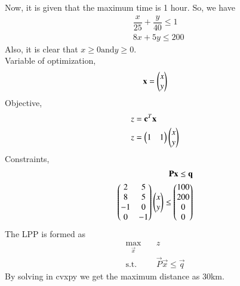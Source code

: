 \documentclass[journal,12pt,twocolumn]{IEEEtran}
\renewcommand\thesection{\arabic{section}}
\begin{document}
\begin{enumerate}[label=\thesection.\arabic*.,ref=\thesection.\theenumi]
Now, it is given that the maximum time is 1 hour. So, we have
\begin{align}
&\dfrac{x}{25}+\dfrac{y}{40}\leq 1\\
&8x+5y\leq200
\end{align}
Also, it is clear that $x\geq 0 \text{and} y \geq0$.\\
Variable of optimization,
\begin{align}
\mathbf{x} = \begin{pmatrix}x\\y\end{pmatrix}
\end{align}
Objective,
\begin{align}
&z = \mathbf{c}^T\mathbf{x}\\
&z=\begin{pmatrix}1&1\end{pmatrix}\begin{pmatrix}x\\y\end{pmatrix}
\end{align}
Constraints,
\begin{align}
\mathbf{P}\mathbf{x}\leq \mathbf{q}\\
\begin{pmatrix}2&5\\8&5\\-1&0\\0&-1\end{pmatrix}\begin{pmatrix}x\\y\end{pmatrix} \leq \begin{pmatrix}100\\200\\0\\0\end{pmatrix}
\end{align}
The LPP is formed as
\begin{align}
\max_{\vec{x}} \quad &z \nonumber\\
\textrm{s.t.} \quad &\vec{P}\vec{x}\leq \vec{q}  
\end{align}
By solving in cvxpy we get the maximum distance as 30km.
\end{enumerate}
\end{document}
